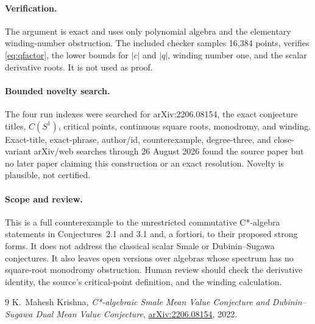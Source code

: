 \documentclass[11pt]{article}
\begin{document}
\paragraph{Verification.}
The argument is exact and uses only polynomial algebra and the elementary
winding-number obstruction.  The included checker samples 16,384 points,
verifies \eqref{eq:qfactor}, the lower bounds for $|c|$ and $|q|$, winding
number one, and the scalar derivative roots.  It is not used as proof.

\paragraph{Bounded novelty search.}
The four run indexes were searched for arXiv:2206.08154, the exact conjecture
titles, $C(S^1)$, critical points, continuous square roots, monodromy, and
winding.  Exact-title, exact-phrase, author/id, counterexample, degree-three,
and close-variant arXiv/web searches through 26 August 2026 found the source
paper but no later paper claiming this construction or an exact resolution.
Novelty is plausible, not certified.

\paragraph{Scope and review.}
This is a full counterexample to the unrestricted commutative C*-algebra
statements in Conjectures~2.1 and 3.1 and, a fortiori, to their proposed
strong forms.  It does not address the classical scalar Smale or
Dubinin--Sugawa conjectures.  It also leaves open versions over algebras whose
spectrum has no square-root monodromy obstruction.  Human review should check
the derivative identity, the source's critical-point definition, and the
winding calculation.

\begingroup
\sloppy
\raggedright
\begin{thebibliography}{9}
K.~Mahesh Krishna,
\emph{C*-algebraic Smale Mean Value Conjecture and Dubinin--Sugawa Dual Mean
Value Conjecture},
\href{https://arxiv.org/abs/2206.08154}{arXiv:2206.08154}, 2022.
\end{thebibliography}
\endgroup
\end{document}
